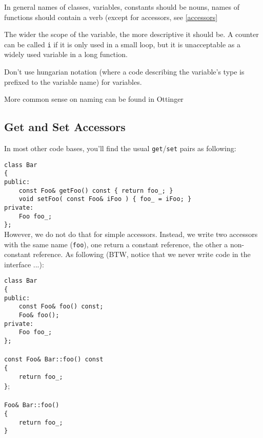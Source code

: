 \documentclass[10pt,a4paper,titlepage,dutch]{report}
\begin{document}
In general names of classes, variables, constants should be nouns,
names of functions should contain a verb (except for accessors,
see \ref{accessors}

The wider the scope of the variable, the more descriptive it
should be. A counter can be called \verb|i| if it is only used in
a small loop, but it is unacceptable as a widely used variable in
a long function.

Don't use hungarian notation (where a code describing the
variable's type is prefixed to the variable name) for variables.

More common sense on naming can be found in Ottinger
\cite{Ottinger}

\subsection{Get and Set Accessors}

In most other code bases, you'll find the usual
\verb|get|/\verb|set| pairs as following:

\verb|class Bar|\\
\verb|{|\\
\verb|public:|\\
\verb|    const Foo& getFoo() const { return foo_; }|\\
\verb|    void setFoo( const Foo& iFoo ) { foo_ = iFoo; }|\\
\verb|private:|\\
\verb|    Foo foo_;|\\
\verb|};|\\

However, we do not do that for simple accessors.  Instead, we
write two accessors with the same name (\verb|foo|), one return a
constant reference, the other a non-constant reference.  As
following (BTW, notice that we never write code in the interface
...):

\verb|class Bar|\\
\verb|{|\\
\verb|public:|\\
\verb|    const Foo& foo() const;|\\
\verb|    Foo& foo();|\\
\verb|private:|\\
\verb|    Foo foo_;|\\
\verb|};|\\
\verb||\\
\verb|const Foo& Bar::foo() const|\\
\verb|{|\\
\verb|    return foo_;|\\
\verb|}|;\\
\verb||\\
\verb|Foo& Bar::foo()|\\
\verb|{|\\
\verb|    return foo_;|\\
\verb|}|\\
\end{document}
